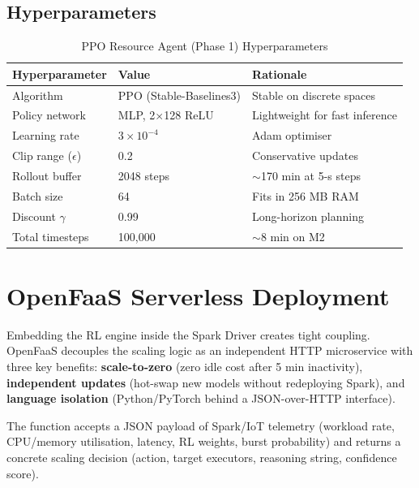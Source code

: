 \subsection{Hyperparameters}

\begin{table}[H]
\centering
\caption{PPO Resource Agent (Phase 1) Hyperparameters}
\label{tab:ppo_hparams}
\begin{tabular}{lll}
\toprule
\textbf{Hyperparameter} & \textbf{Value} & \textbf{Rationale} \\
\midrule
Algorithm           & PPO (Stable-Baselines3) & Stable on discrete spaces \\
Policy network      & MLP, 2$\times$128 ReLU  & Lightweight for fast inference \\
Learning rate       & $3\times10^{-4}$         & Adam optimiser \\
Clip range ($\epsilon$) & 0.2              & Conservative updates \\
Rollout buffer      & 2048 steps               & $\sim$170 min at 5-s steps \\
Batch size          & 64                       & Fits in 256 MB RAM \\
Discount $\gamma$   & 0.99                     & Long-horizon planning \\
Total timesteps     & 100,000                  & $\sim$8 min on M2 \\
\bottomrule
\end{tabular}
\end{table}

\section{OpenFaaS Serverless Deployment}
\label{sec:openfaas}
Embedding the RL engine inside the Spark Driver creates tight coupling. OpenFaaS
decouples the scaling logic as an independent HTTP microservice with three key benefits:
\textbf{scale-to-zero} (zero idle cost after 5 min inactivity),
\textbf{independent updates} (hot-swap new models without redeploying Spark), and
\textbf{language isolation} (Python/PyTorch behind a JSON-over-HTTP interface).

The function accepts a JSON payload of Spark/IoT telemetry (workload rate, CPU/memory
utilisation, latency, RL weights, burst probability) and returns a concrete scaling
decision (action, target executors, reasoning string, confidence score).

